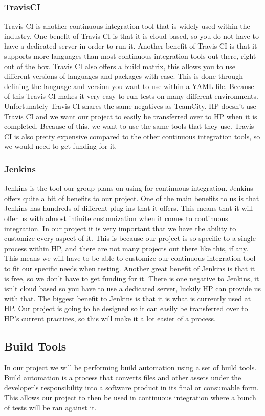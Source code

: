 \documentclass[onecolumn, draftclsnofoot,10pt, compsoc]{IEEEtran}
\begin{document}
\subsubsection{TravisCI}
Travis CI is another continuous integration tool that is widely used within the industry. One benefit of Travis CI is that it is cloud-based, so you do not have to have a dedicated server in order to run it. Another benefit of Travis CI is that it supports more languages than most continuous integration tools out there, right out of the box. Travis CI also offers a build matrix, this allows you to use different versions of languages and packages with ease. This is done through defining the language and version you want to use within a YAML file. Because of this Travis CI makes it very easy to run tests on many different environments. Unfortunately Travis CI shares the same negatives as TeamCity. HP doesn't use Travis CI and we want our project to easily be transferred over to HP when it is completed. Because of this, we want to use the same tools that they use. Travis CI is also pretty expensive compared to the other continuous integration tools, so we would need to get funding for it. 
\subsubsection{Jenkins}
Jenkins is the tool our group plans on using for continuous integration. Jenkins offers quite a bit of benefits to our project. One of the main benefits to us is that Jenkins has hundreds of different plug ins that it offers. This means that it will offer us with almost infinite customization when it comes to continuous integration. In our project it is very important that we have the ability to customize every aspect of it. This is because our project is so specific to a single process within HP, and there are not many projects out there like this, if any. This means we will have to be able to customize our continuous integration tool to fit our specific needs when testing. Another great benefit of Jenkins is that it is free, so we don't have to get funding for it. There is one negative to Jenkins, it isn't cloud based so you have to use a dedicated server, luckily HP can provide us with that. The biggest benefit to Jenkins is that it is what is currently used at HP. Our project is going to be designed so it can easily be transferred over to HP's current practices, so this will make it a lot easier of a process.

\subsection{Build Tools}
In our project we will be performing build automation using a set of build tools. Build automation is a process that converts files and other assets under the developer's responsibility into a software product in its final or consumable form. This allows our project to then be used in continuous integration where a bunch of tests will be ran against it.  
\end{document}

